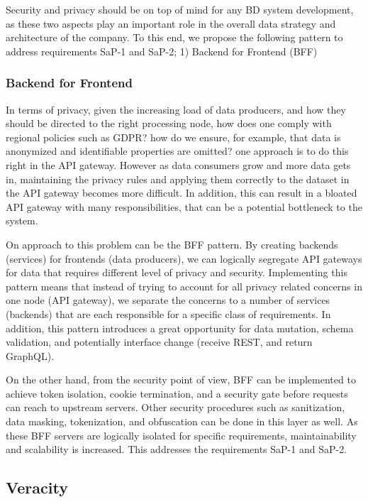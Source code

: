 \documentclass[a4paper,11pt,article,oneside]{memoir}
\begin{document}
Security and privacy should be on top of mind for any BD system development, as these two aspects play an important role in the overall data strategy and architecture of the company. To this end, we propose the following pattern to address requirements SaP-1 and SaP-2; 1) Backend for Frontend (BFF)

\subsubsection{Backend for Frontend}

In terms of privacy, given the increasing load of data producers, and how they should be directed to the right processing node, how does one comply with regional policies such as GDPR? how do we ensure, for example, that data is anonymized and identifiable properties are omitted? one approach is to do this right in the API gateway. However as data consumers grow and more data gets in, maintaining the privacy rules and applying them correctly to the dataset in the API gateway becomes more difficult. In addition, this can result in a bloated API gateway with many responsibilities, that can be a potential bottleneck to the system.

On approach to this problem can be the BFF pattern. By creating backends (services) for frontends (data producers), we can logically segregate API gateways for data that requires different level of privacy and security. Implementing this pattern means that instead of trying to account for all privacy related concerns in one node (API gateway), we separate the concerns to a number of services (backends) that are each responsible for a specific class of requirements. In addition, this pattern introduces a great opportunity for data mutation, schema validation, and potentially interface change (receive REST, and return GraphQL).

On the other hand, from the security point of view, BFF can be implemented to achieve token isolation, cookie termination, and a security gate before requests can reach to upstream servers. Other security procedures such as sanitization, data masking, tokenization, and obfuscation can be done in this layer as well. As these BFF servers are logically isolated for specific requirements, maintainability and scalability is increased. This addresses the requirements SaP-1 and SaP-2. 


\subsection{Veracity}
\end{document}
